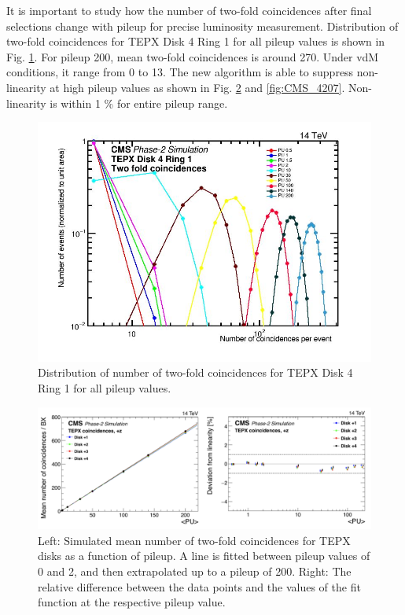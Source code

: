 
It is important to study how the number of two-fold coincidences after final selections change with pileup for precise luminosity measurement. Distribution of two-fold coincidences for TEPX Disk 4 Ring 1 for all pileup values is shown in Fig. \ref{fig:tepx_coin_allPU}. For pileup 200, mean two-fold coincidences is around 270. Under vdM conditions, it range from 0 to 13. The new algorithm is able to suppress non-linearity at high pileup values as shown in Fig.  \ref{fig:CMS_420}  and \ref{fig:CMS_4207}. Non-linearity is within 1 \% for entire pileup range.

\begin{figure}[H]
  \centering
  \includegraphics[width=0.7\columnwidth]{ashish_thesis/tepx_D4R1_coin_allpu_1.png}
  \caption[TEPX D4R1 Two-Fold Coincidences All Pileup]{Distribution of number of two-fold coincidences for TEPX Disk 4 Ring 1 for all pileup values.}
  \label{fig:tepx_coin_allPU}
\end{figure}


\begin{figure}[H]
  \centering
  \includegraphics[width=1\columnwidth]{ashish_thesis/michigan_1.png}
  \caption[TEPX two-fold coincidences fit And residuals]{\onehalfspacing Left: Simulated mean number of two-fold coincidences for TEPX disks as a function of pileup. A line is fitted between pileup values of 0 and 2, and then extrapolated up to a pileup of 200. Right: The relative difference between the data points and the values of the fit function at the respective pileup value.}
  \label{fig:CMS_420}
\end{figure}


